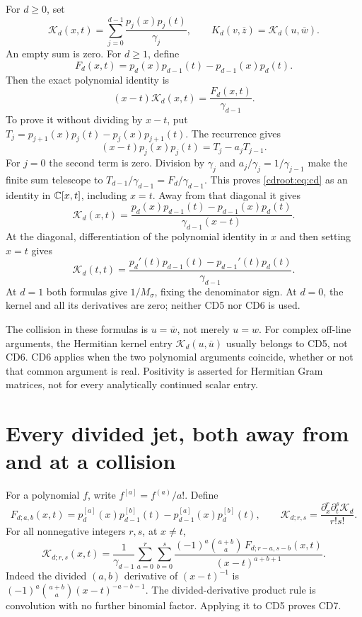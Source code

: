 For \(d\geq0\), set
\[
 \mathcal K_d(x,t)=\sum_{j=0}^{d-1}\frac{p_j(x)p_j(t)}{\gamma_j},
 \qquad K_d(v,\overline z)=\mathcal K_d(u,\overline w).
\]
An empty sum is zero. For \(d\geq1\), define
\[
 F_d(x,t)=p_d(x)p_{d-1}(t)-p_{d-1}(x)p_d(t).
\]
Then the exact polynomial identity is
\begin{equation}\label{cdroot:eq:cd}
 (x-t)\mathcal K_d(x,t)=\frac{F_d(x,t)}{\gamma_{d-1}}.
 \tag{CD4}
\end{equation}
To prove it without dividing by \(x-t\), put
\(T_j=p_{j+1}(x)p_j(t)-p_j(x)p_{j+1}(t)\).
The recurrence gives
\[
 (x-t)p_j(x)p_j(t)=T_j-a_jT_{j-1}.
\]
For \(j=0\) the second term is zero. Division by \(\gamma_j\) and
\(a_j/\gamma_j=1/\gamma_{j-1}\) make the finite sum telescope to
\(T_{d-1}/\gamma_{d-1}=F_d/\gamma_{d-1}\).
This proves \eqref{cdroot:eq:cd} as an identity in \(\mathbb C[x,t]\), including
\(x=t\). Away from that diagonal it gives
\begin{equation}\label{cdroot:eq:offdiagonal}
 \boxed{\mathcal K_d(x,t)=
 \frac{p_d(x)p_{d-1}(t)-p_{d-1}(x)p_d(t)}
      {\gamma_{d-1}(x-t)}.}
 \tag{CD5}
\end{equation}
At the diagonal, differentiation of the polynomial identity in \(x\)
and then setting \(x=t\) gives
\begin{equation}\label{cdroot:eq:diagonal}
 \boxed{\mathcal K_d(t,t)=
 \frac{p_d'(t)p_{d-1}(t)-p_{d-1}'(t)p_d(t)}{\gamma_{d-1}}.}
 \tag{CD6}
\end{equation}
At \(d=1\) both formulas give \(1/M_\sigma\), fixing the denominator
sign. At \(d=0\), the kernel and all its derivatives are zero; neither
CD5 nor CD6 is used.

The collision in these formulas is \(u=\overline w\), not merely
\(u=w\). For complex off-line arguments, the Hermitian kernel entry
\(\mathcal K_d(u,\overline u)\) usually belongs to CD5, not CD6.
CD6 applies when the two polynomial arguments coincide, whether or not
that common argument is real. Positivity is asserted for Hermitian Gram
matrices, not for every analytically continued scalar entry.

\section{Every divided jet, both away from and at a collision}

For a polynomial \(f\), write \(f^{[a]}=f^{(a)}/a!\). Define
\[
 F_{d;a,b}(x,t)=p_d^{[a]}(x)p_{d-1}^{[b]}(t)
             -p_{d-1}^{[a]}(x)p_d^{[b]}(t),
 \qquad
 \mathcal K_{d;r,s}=\frac{\partial_x^r\partial_t^s\mathcal K_d}{r!s!}.
\]
For all nonnegative integers \(r,s\), at \(x\ne t\),
\begin{equation}\label{cdroot:eq:jets-away}
 \boxed{\mathcal K_{d;r,s}(x,t)=\frac1{\gamma_{d-1}}
  \sum_{a=0}^r\sum_{b=0}^s
  \frac{(-1)^a\binom{a+b}{a}\,
        F_{d;r-a,s-b}(x,t)}{(x-t)^{a+b+1}}.}
 \tag{CD7}
\end{equation}
Indeed the divided \((a,b)\) derivative of \((x-t)^{-1}\) is
\((-1)^a\binom{a+b}{a}(x-t)^{-a-b-1}\). The divided-derivative product
rule is convolution with no further binomial factor. Applying it to
CD5 proves CD7.

